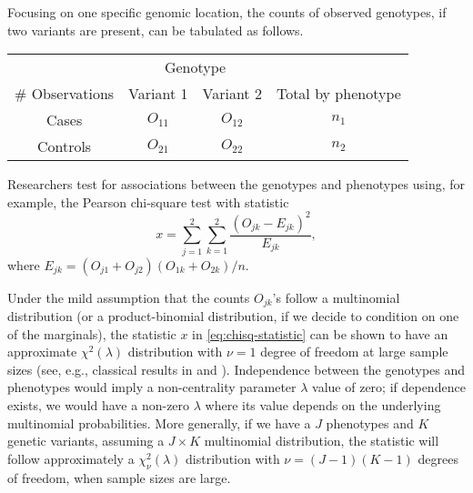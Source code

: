 Focusing on one specific genomic location, the counts of observed genotypes, if two variants are present, can be tabulated as follows.
\begin{center}
    \begin{tabular}{cccc}
    \hline
    & \multicolumn{2}{c}{Genotype} & \\
    \cline{2-3}
    \# Observations & Variant 1 & Variant 2 & Total by phenotype \\
    \hline
    Cases & $O_{11}$ & $O_{12}$ & $n_1$ \\
    Controls & $O_{21}$ & $O_{22}$ & $n_2$ \\
    \hline
    \end{tabular}
\end{center}
Researchers test for associations between the genotypes and phenotypes using, for example, the Pearson chi-square test with statistic
\begin{equation} \label{eq:chisq-statistic}
    x = \sum_{j=1}^2 \sum_{k=1}^2 \frac{(O_{jk} - E_{jk})^2}{E_{jk}},
\end{equation}
where ${E}_{jk} = (O_{j1}+O_{j2})(O_{1k}+O_{2k})/n$.

Under the mild assumption that the counts $O_{jk}$'s follow a multinomial distribution (or a product-binomial distribution, if we decide to condition on one of the marginals), the statistic $x$ in \eqref{eq:chisq-statistic} can be shown to have an approximate $\chi^2(\lambda)$ distribution with $\nu=1$ degree of freedom at large sample sizes (see, e.g., classical results in \citet{ferguson2017course} and
\cite{agresti2018introduction}). 
Independence between the genotypes and phenotypes would imply a non-centrality parameter $\lambda$ value of zero; if dependence exists, we would have a non-zero $\lambda$ where its value depends on the underlying multinomial probabilities.
More generally, if we have a $J$ phenotypes and $K$ genetic variants, assuming a $J\times K$ multinomial distribution, the statistic will follow approximately a $\chi^2_{\nu}(\lambda)$ distribution with $\nu = (J-1)(K-1)$ degrees of freedom, when sample sizes are large.

